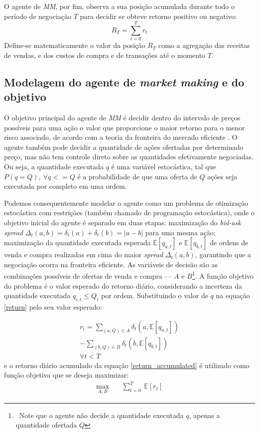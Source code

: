 O agente de \textit{MM}, por fim, observa a sua posição acumulada durante todo o período de negociação $T$ para decidir se obteve retorno positivo ou negativo:
\begin{equation} \label{return_accumulated}
    R_{T} = \sum_{t=0}^{T} r_t
\end{equation}
Define-se matematicamente o valor da posição $R_T$ como a agregação das receitas de vendas, e dos custos de compra e de transações até o momento $T$. 

\subsection{Modelagem do agente de \textit{market making} e do objetivo}
O objetivo principal do agente de \textit{MM} é decidir dentro do intervalo de preços possíveis para uma ação o valor que proporcione o maior retorno para o menor risco associado, de acordo com a teoria da fronteira do mercado eficiente \citep{markowitz1952}. O agente também pode decidir a quantidade de ações ofertadas por determinado preço, mas não tem controle direto sobre as quantidades efetivamente negociadas. Ou seja, a quantidade executada $q$ é uma variável estocástica, tal que $P(q = Q), \ \forall q <= Q$ é a probabilidade de que uma oferta de $Q$ ações seja executada por completo em uma ordem. 

Podemos consequentemente modelar o agente como um problema de otimização estocástica com restrições (também chamado de programação estocástica), onde o objetivo inicial do agente é separado em duas etapas: maximização do \textit{bid-ask spread} $\Delta_{t}(a, b) = \delta_{t}(a) + \delta_{t}(b) = |a - b|$  para uma mesma ação; maximização da quantidade executada esperada $\mathbb{E} [q_{a, t}]$ e $\mathbb{E} [q_{b, t}]$ de ordens de venda e compra realizadas em cima do maior \textit{spread} $\Delta_{t}(a, b)$, garantindo que a negociação ocorra na fronteira eficiente. As variáveis de decisão são as combinações possíveis de ofertas de venda e compra — $A$ e $B$\footnote{\ Note que o agente não decide a quantidade executada $q$, apenas a quantidade ofertada $Q$}. A função objetivo do problema é o valor esperado do retorno diário, considerando a incerteza da quantidade executada $q_{i, t} \leq Q_{i}$ por ordem. Substituindo o valor de $q$ na equação \ref{return} pelo seu valor esperado:

\begin{equation}
	\begin{aligned}
		r_{t} = \sum_{(a, Q) \in A} \delta_{t}(a, \mathbb{E}[q_{a, t}]) \\
		-\sum_{(b, Q) \in B} \delta_{t}(b, \mathbb{E}[q_{b, t}]) \\
		\forall t < T
	\end{aligned}
\end{equation}
e o retorno diário acumulado da equação \ref{return_accumulated} é utilizado como função objetiva que se deseja maximizar:
\begin{equation}
	\begin{aligned}
		\max_{A, B} \quad & \sum_{t=0}^{T} \ \mathbb{E} [r_{t}]
	\end{aligned}
\end{equation}

